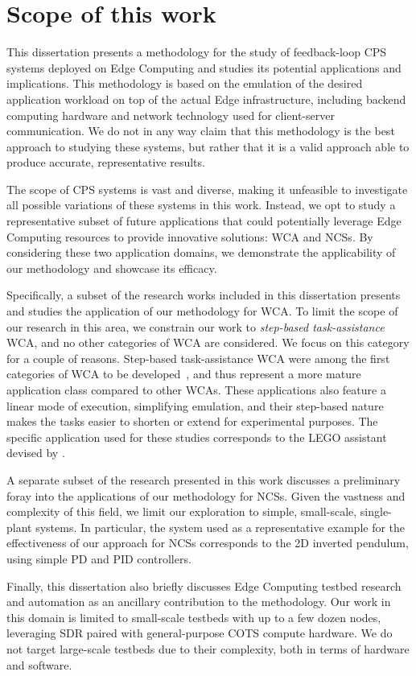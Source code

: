 \section{Scope of this work}

This dissertation presents a methodology for the study of feedback-loop \gls{CPS} systems deployed on Edge Computing and studies its potential applications and implications.
This methodology is based on the emulation of the desired application workload on top of the actual Edge infrastructure, including backend computing hardware and network technology used for client-server communication.
We do not in any way claim that this methodology is the best approach to studying these systems, but rather that it is a valid approach able to produce accurate, representative results.

The scope of \gls{CPS} systems is vast and diverse, making it unfeasible to investigate all possible variations of these systems in this work. 
Instead, we opt to study a representative subset of future applications that could potentially leverage Edge Computing resources to provide innovative solutions: \gls{WCA} and \glspl{NCS}.
By considering these two application domains, we demonstrate the applicability of our methodology and showcase its efficacy.

Specifically, a subset of the research works included in this dissertation presents and studies the application of our methodology for \gls{WCA}.
To limit the scope of our research in this area, we constrain our work to \emph{step-based task-assistance} \gls{WCA}, and no other categories of \gls{WCA} are considered.
We focus on this category for a couple of reasons.
Step-based task-assistance \gls{WCA} were among the first categories of \gls{WCA} to be developed~\cite{chen2015early}, and thus represent a more mature application class compared to other \glspl{WCA}.
These applications also feature a linear mode of execution, simplifying emulation, and their step-based nature makes the tasks easier to shorten or extend for experimental purposes.
The specific application used for these studies corresponds to the LEGO assistant devised by \citeauthor{chen2015early}\cite{chen2015early}.

A separate subset of the research presented in this work discusses a preliminary foray into the applications of our methodology for \glspl{NCS}.
Given the vastness and complexity of this field, we limit our exploration to simple, small-scale, single-plant systems.
In particular, the system used as a representative example for the effectiveness of our approach for \glspl{NCS} corresponds to the \gls{2D} inverted pendulum, using simple \gls{PD} and \gls{PID} controllers.

Finally, this dissertation also briefly discusses Edge Computing testbed research and automation as an ancillary contribution to the methodology.
Our work in this domain is limited to small-scale testbeds with up to a few dozen nodes, leveraging \gls{SDR} paired with general-purpose \gls{COTS} compute hardware.
We do not target large-scale testbeds due to their complexity, both in terms of hardware and software.